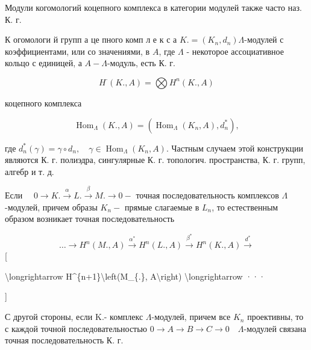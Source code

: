 \documentclass[10pt]{article}
\begin{document}
Модули когомологий коцепного комплекса в категории модулей также часто наз. К. г.



К огомологи й групп а це пного комп л е к с а $K .=\left(K_{n}, d_{n}\right) \Lambda$-модулей с коэффициентами, или со значениями, в $A$, где $\Lambda$ - некоторое ассоциативное кольцо с единицей, а $A-\Lambda$-модуль, есть К. г.



\[

H^{\cdot}(K ., A)=\bigotimes H^{n}(K ., A)

\]



коцепного комплекса



\[

\operatorname{Hom}_{\Lambda}(K ., A)=\left(\operatorname{Hom}_{\Lambda}\left(K_{n}, A\right), d_{n}^{*}\right),

\]



где $d_{n}^{*}(\gamma)=\gamma \circ d_{n}, \quad \gamma \in \operatorname{Hom}_{\Lambda}\left(K_{n}, A\right)$. Частным случаем этой конструкции являются К. г. полиэдра, сингулярные К. г. топологич. пространства, К. г. групп, алгебр и т. д.



Если $\quad 0 \rightarrow K . \stackrel{\alpha}{\rightarrow} L . \stackrel{\beta}{\rightarrow} M . \rightarrow 0-$ точная последовательность комплексов $\Lambda$-модулей, причем образы $K_{n}-$ прямые слагаемые в $L_{n}$, то естественным образом возникает точная последовательность



\[

\ldots \rightarrow H^{n}(M ., A) \stackrel{\alpha^{*}}{\longrightarrow} H^{n}(L ., A) \stackrel{\beta^{*}}{\rightarrow} H^{n}(K ., A) \stackrel{d^{*}}{\longrightarrow}

\][



\textbackslash longrightarrow H\^{}\{n+1\}\textbackslash left(M\_\{.\}, A\textbackslash right) \textbackslash longrightarrow ···

]



С другой стороны, если K.- комплекс $\Lambda$-модулей, причем все $K_{n}$ проективны, то с каждой точной последовательностью $0 \rightarrow A \rightarrow B \rightarrow C \rightarrow 0 \quad \Lambda$-модулей связана точная последовательность К. г.
\end{document}

